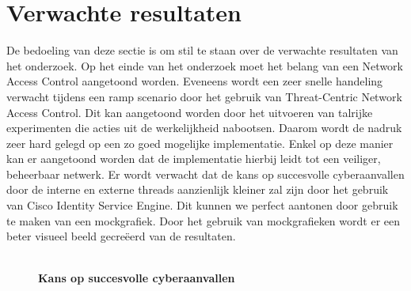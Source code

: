 \section{Verwachte resultaten}
\label{sec:verwachte_resultaten}
De bedoeling van deze sectie is om stil te staan over de verwachte resultaten van het onderzoek. Op het einde van het onderzoek moet het belang van een Network Access Control aangetoond worden. Eveneens wordt een zeer snelle handeling verwacht tijdens een ramp scenario door het gebruik van Threat-Centric Network Access Control. Dit kan aangetoond worden door het uitvoeren van talrijke experimenten die acties uit de werkelijkheid nabootsen. Daarom wordt de nadruk zeer hard gelegd op een zo goed mogelijke implementatie. Enkel op deze manier kan er aangetoond worden dat de implementatie hierbij leidt tot een veiliger, beheerbaar netwerk. Er wordt verwacht dat de kans op succesvolle cyberaanvallen door de interne en externe threads aanzienlijk kleiner zal zijn door het gebruik van Cisco Identity Service Engine. Dit kunnen we perfect aantonen door gebruik te maken van een mockgrafiek. Door het gebruik van mockgrafieken wordt er een beter visueel beeld gecreëerd van de resultaten.
\\ \\
\begin{figure}[!t]
	\centering
	\textbf{Kans op succesvolle cyberaanvallen}\par\medskip
{}
\end{figure}

